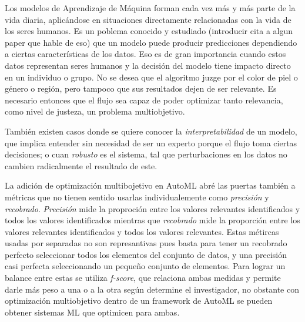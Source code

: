 Los modelos de Aprendizaje de M\'aquina forman cada vez m\'as y m\'as parte de la vida diaria, aplic\'andose en situaciones directamente  relacionadas con la vida de los seres humanos. Es un poblema conocido y estudiado (introducir cita a algun paper que hable de eso) que un modelo puede producir predicciones dependiendo a ciertas caracter\'isticas de los datos. Eso es de gran importancia cuando estos datos representan seres humanos y la decisi\'on del modelo tiene impacto directo en un individuo o grupo. No se desea que el algoritmo juzge por el color de piel o g\'enero o regi\'on, pero tampoco que sus resultados dejen de ser relevante. Es necesario entonces que el flujo sea capaz de poder optimizar tanto  relevancia, como  nivel de justeza, un problema multiobjetivo.

Tambi\'en existen casos donde se quiere conocer la \textit{interpretabilidad} de un modelo, que implica entender sin necesidad de ser un experto porque el flujo toma ciertas decisiones; o cuan \textit{robusto} es el sistema, tal que perturbaciones en los datos no cambien radicalmente el resultado de este.

La adici\'on de optimizaci\'on multibojetivo en AutoML abr\'e las puertas tambi\'en a m\'etricas que no tienen sentido usarlas individualemente como \textit{precisi\'on} y \textit{recobrado}.
\textit{Precisi\'on} mide la proproci\'on entre los valores relevantes identificados y todos los valores identificados mientras que \textit{recobrado} mide la proporci\'on entre los valores relevantes identificados y todos los valores relevantes. Estas m\'etircas usadas por separadas no son represantivas pues basta para tener un recobrado perfecto seleccionar todos los elementos del conjunto de datos, y una precisi\'on casi perfecta seleccionando un pequeño conjunto de elementos. Para lograr un balance entre estas se utiliza \textit{f-score}, que relaciona ambas medidas y permite darle m\'as peso a una o a la otra seg\'un determine el investigador, no obstante con optimizaci\'on multiobjetivo dentro de un framework de AutoML se pueden obtener sistemas ML que optimicen para ambas.



